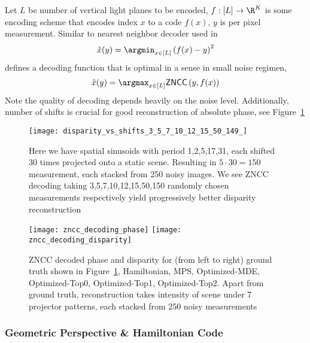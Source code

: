 \documentclass[../writeup.tex]{subfiles}
\begin{document}
Let $L$ be number of vertical light planes to be encoded, $f:[L]\to\R^K$ is some encoding scheme that encodes index $x$ to a code $f(x)$, $y$ is per pixel measurement. Similar to nearest neighbor decoder used in \cite{hornOptimalStructuredLight1997}
\begin{align}
    \hat{x}(y)
        = \argmin_{x\in [L]} \left( f(x) - y \right)^2
    \label{eq:nearest_neighbor_decoder}
\end{align}
\cite{mirdehghanOptimalStructuredLight2018} defines a decoding function that is optimal in a sense in small noise regimen,
\begin{align}
    \hat{x}(y)
        = \argmax_{x\in[L]} \textsf{ZNCC}\left( y, f(x) \right)
    \label{eq:zncc_decoder}
\end{align}
Note the quality of decoding depends heavily on the noise level. Additionally, number of shifts is crucial for good reconstruction of absolute phase, see Figure~\ref{fig:disparity_vs_random_shifts}
\begin{figure}[h!]
    \begin{center}
        \texttt{[image: disparity\_vs\_shifts\_3\_5\_7\_10\_12\_15\_50\_149\_]}
    \end{center}
    \caption{Here we have spatial sinusoids with period 1,2,5,17,31, each shifted 30 times projected onto a static scene. Resulting in $5\cdot 30=150$ measurement, each stacked from 250 noisy images. We see ZNCC decoding taking 3,5,7,10,12,15,50,150 randomly chosen measurements respectively yield progressively better disparity reconstruction}
    \label{fig:disparity_vs_random_shifts}
\end{figure}
\begin{figure}[h!]
    \begin{center}
        \texttt{[image: zncc\_decoding\_phase]}
        \texttt{[image: zncc\_decoding\_disparity]}
    \end{center}
    \caption{ZNCC decoded phase and disparity for (from left to right) ground truth shown in Figure~\ref{fig:disparity_vs_random_shifts}, Hamiltonian, MPS, Optimized-MDE, Optimized-Top0, Optimized-Top1, Optimized-Top2. Apart from ground truth, reconstruction takes intensity of scene under 7 projector patterns, each stacked from 250 noisy measurements}
    \label{fig:zncc_decoding_phase_disparity}
\end{figure}

\subsubsection{Geometric Perspective \& Hamiltonian Code} 
 
\end{document}

